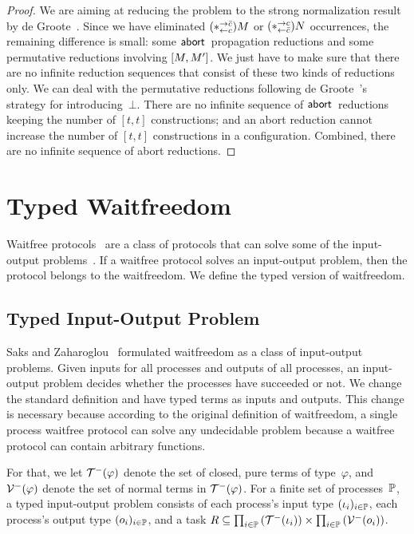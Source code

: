 {\begin{proof}
We are aiming at reducing the problem to the strong normalization result
by de Groote~\cite{Philippe2002js}.
Since we have eliminated $(\ast^{\rightarrow {\bar{c}}}_{\leftarrow{c}})M$ or $(\ast^{\rightarrow {c}}_{\leftarrow{\bar{c}}})N$ occurrences,
the remaining difference is small: some $\mathsf{abort\,}$ propagation reductions
 and some permutative reductions involving $[{M,M'}]$.
We just have to make sure that there are no infinite reduction sequences
that consist of these two kinds of reductions only.
We can deal with the permutative reductions following de
 Groote~\cite{Philippe2002js}'s strategy for introducing~$\bot$.
 There are no infinite sequence of $\mathsf{abort\,}$ reductions keeping the
 number of $[t,t]$ constructions; and an abort reduction cannot increase
 the number of $[t,t]$ constructions in a configuration.  Combined,
 there are no infinite sequence of abort reductions.
\end{proof}


\section{Typed Waitfreedom}
\label{waitfreedom}

Waitfree protocols~\cite{Herlihy88,Saks:1993vq} are a class of protocols
that can solve
some of the input-output problems~\cite{Moran:1987ep,Biran:1988hh}.
If a waitfree protocol solves an input-output problem, then the protocol
belongs to the waitfreedom.
We define the typed version of waitfreedom.

\subsection{Typed Input-Output Problem}

Saks and Zaharoglou~\cite{Saks:1993vq} formulated waitfreedom as a class
of input-output
problems.
Given inputs for all processes and outputs of all
processes, an input-output problem decides whether the processes have
succeeded or not.
We change the standard definition and have typed terms as inputs and
outputs.
This change is necessary because according to the original definition of
waitfreedom,
a single process waitfree protocol can solve any undecidable problem
because a waitfree protocol can contain arbitrary functions.

For that, we let $\mathcal{T}^-(\varphi)$ denote the set of closed, pure terms of
type~$\varphi$,
and $\mathcal{V}^-(\varphi)$ denote the set of normal terms in $\mathcal{T}^-(\varphi)$.
For a finite set of processes~$\mathbb{P}$,
a typed input-output problem consists
of each process's input type
$(\iota_i)_{i\in \mathbb{P}}$, each process's output type $(o_i)_{i\in
\mathbb{P}}$, and a
task $R\subseteq \prod_{i\in \mathbb{P}}\left(\mathcal{T}^-(\iota_i)\right)\times
 \prod_{i\in \mathbb{P}}\left(\mathcal{V}^-(o_i)\right)$.

}
